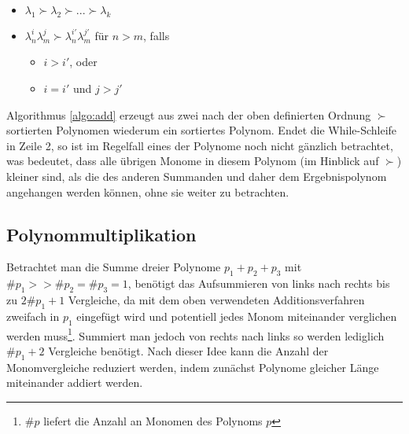 \begin{itemize}
    \label{def:order}
    \item $\lambda_1 \succ \lambda_2 \succ...\succ \lambda_k $
    \item $\lambda_n^i \lambda_m^j \succ \lambda_n^{i'} \lambda_m^{j'} $ für $n > m$, falls
    \begin{itemize}
        \item[] $ i > i'$, oder
        \item[] $ i = i'$ und $ j > j'$
    \end{itemize}
\end{itemize}


Algorithmus \ref{algo:add} erzeugt aus zwei nach der oben definierten Ordnung $\succ$ sortierten Polynomen wiederum ein sortiertes Polynom. Endet die While-Schleife in Zeile 2, so ist im Regelfall eines der Polynome noch nicht gänzlich betrachtet, was bedeutet, dass alle übrigen Monome in diesem Polynom (im Hinblick auf $\succ$) kleiner sind, als die des anderen Summanden und daher dem Ergebnispolynom angehangen werden können, ohne sie weiter zu betrachten. 

\subsection{Polynommultiplikation}


Betrachtet man die Summe dreier Polynome $p_1 + p_2 + p_3$ mit $\#p_1 >> \#p_2 = \#p_3 = 1$, benötigt das Aufsummieren von links nach rechts bis zu $2\#p_1 + 1$ Vergleiche, da mit dem oben verwendeten Additionsverfahren zweifach in $p_1$ eingefügt wird und potentiell jedes Monom miteinander verglichen werden muss\footnote{$\#p$ liefert die Anzahl an Monomen des Polynoms $p$}. Summiert man jedoch von rechts nach links so werden lediglich $\#p_1 + 2$ Vergleiche benötigt. Nach dieser Idee kann die Anzahl der Monomvergleiche reduziert werden, indem zunächst Polynome gleicher Länge miteinander addiert werden. 


